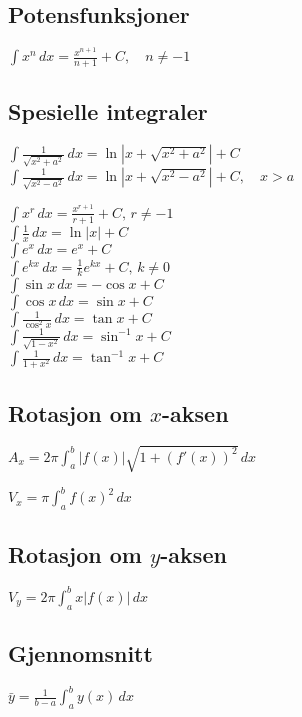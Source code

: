 \documentclass[a4paper,7pt,fleqn]{article}
\begin{document}
\begin{multicols}{2}
\begin{minipage}{\linewidth}
\subsection*{Potensfunksjoner}
\(\int x^n \, dx = \frac{x^{n+1}}{n+1} + C, \quad n \neq -1\) \\

\subsection*{Spesielle integraler}
\(\int \frac{1}{\sqrt{x^2 + a^2}} \, dx = \ln\left|x + \sqrt{x^2 + a^2}\right| + C\) \\
\(\int \frac{1}{\sqrt{x^2 - a^2}} \, dx = \ln\left|x + \sqrt{x^2 - a^2}\right| + C, \quad x > a\)
\end{minipage}

\begin{minipage}{\linewidth}
\(\int x^r \, dx = \frac{x^{r+1}}{r+1} + C, \, r \neq -1\) \\
\(\int \frac{1}{x} \, dx = \ln|x| + C\) \\
\(\int e^x \, dx = e^x + C\) \\
\(\int e^{kx} \, dx = \frac{1}{k} e^{kx} + C, \, k \neq 0\) \\
\(\int \sin x \, dx = -\cos x + C\) \\
\(\int \cos x \, dx = \sin x + C\) \\
\(\int \frac{1}{\cos^2 x} \, dx = \tan x + C\) \\
\(\int \frac{1}{\sqrt{1 - x^2}} \, dx = \sin^{-1} x + C\) \\
\(\int \frac{1}{1 + x^2} \, dx = \tan^{-1} x + C\)
\end{minipage}

\subsection{Rotasjon om \(x\)-aksen}  

\( A_x = 2\pi \int_{a}^{b} |f(x)| \sqrt{1 + (f'(x))^2} \,dx \)  

\( V_x = \pi \int_{a}^{b} f(x)^2 \,dx \)  

\subsection{Rotasjon om \(y\)-aksen}  

\( V_y = 2\pi \int_{a}^{b} x |f(x)| \,dx \)  

\subsection{Gjennomsnitt}  

\( \bar{y} = \frac{1}{b-a} \int_{a}^{b} y(x) \,dx \)  



\end{multicols}
\end{document}
